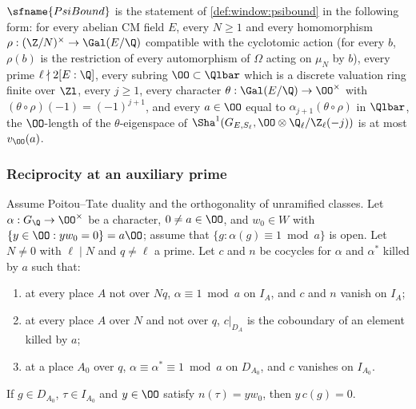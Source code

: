 \begin{definition}\label{pf:vwin:psidef}
$\sfname{PsiBound}$ is the statement of \cref{def:window:psibound} in the following form: for every abelian CM field $E$, every
$N\ge1$ and every homomorphism $\rho:(\Z/N)^\times\to\Gal(E/\Q)$ compatible with the cyclotomic action (for every $b$, $\rho(b)$ is the
restriction of every automorphism of $\Omega$ acting on $\mu_N$ by $b$), every prime $\ell\nmid2[E:\Q]$, every subring $\OO\subset\Qlbar$
which is a discrete valuation ring finite over $\Zl$, every $j\ge1$, every character $\theta:\Gal(E/\Q)\to\OO^\times$ with
$(\theta\circ\rho)(-1)=(-1)^{j+1}$, and every $a\in\OO$ equal to $\alpha_{j+1}(\theta\circ\rho)$ in $\Qlbar$, the $\OO$-length of the
$\theta$-eigenspace of $\Sha^1(G_{E,S_\ell},\OO\otimes\vwinQZ(-j))$ is at most $v_\OO(a)$.
\end{definition}

\subsubsection{Reciprocity at an auxiliary prime}

\begin{lemma}\label{pf:vwin:rec}
Assume Poitou--Tate duality and the orthogonality of unramified classes. Let $\alpha:G_\Q\to\OO^\times$ be a character, $0\ne a\in\OO$,
and $w_0\in W$ with $\{y\in\OO:yw_0=0\}=a\OO$; assume that $\{g:\alpha(g)\equiv1\bmod a\}$ is open. Let $N\ne0$ with $\ell\mid N$ and
$q\ne\ell$ a prime. Let $c$ and $n$ be cocycles for $\alpha$ and $\alpha^*$ killed by $a$ such that:
\begin{enumerate}[label=(\alph*)]
\item at every place $A$ not over $Nq$, $\alpha\equiv1\bmod a$ on $I_A$, and $c$ and $n$ vanish on $I_A$;
\item at every place $A$ over $N$ and not over $q$, $c|_{D_A}$ is the coboundary of an element killed by $a$;
\item at a place $A_0$ over $q$, $\alpha\equiv\alpha^*\equiv1\bmod a$ on $D_{A_0}$, and $c$ vanishes on $I_{A_0}$.
\end{enumerate}
If $g\in D_{A_0}$, $\tau\in I_{A_0}$ and $y\in\OO$ satisfy $n(\tau)=yw_0$, then $y\,c(g)=0$.
\end{lemma}

